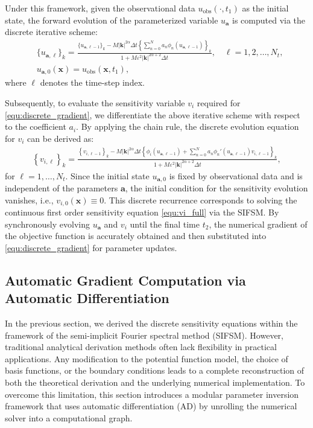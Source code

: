 \documentclass[11pt,reqno]{amsart}
\begin{document}
Under this framework, given the observational data $u_{\text{obs}}(\cdot, t_1)$ as the initial state, the forward evolution of the parameterized variable $u_{\mathbf{a}}$ is computed via the discrete iterative scheme:
\begin{align*}
	&\{u_{\mathbf{a},\ell}\}_k = \frac{\{u_{\mathbf{a},\ell-1}\}_k - M|\mathbf{k}|^{2\alpha}\Delta t \left\{\sum_{n=0}^N a_n\phi_n(u_{\mathbf{a},\ell-1})\right\}_k}{1 + M\varepsilon^2|\mathbf{k}|^{2\alpha+2}\Delta t}, \quad \ell = 1,2,\dots,N_t,\\
	&u_{\mathbf{a},0}(\mathbf{x}) = u_{\text{obs}}(\mathbf{x}, t_1),
\end{align*}
where $\ell$ denotes the time-step index. 

Subsequently, to evaluate the sensitivity variable $v_i$ required for \eqref{equ:discrete_gradient}, we differentiate the above iterative scheme with respect to the coefficient $a_i$. By applying the chain rule, the discrete evolution equation for $v_i$ can be derived as:
\begin{align}
	\label{equ:iter_v}
	\left\{v_{i,\ell}\right\}_k = \frac{\left\{v_{i,\ell-1}\right\}_k - M|\mathbf{k}|^{2\alpha}\Delta t \left\{\phi_i(u_{\mathbf{a},\ell-1}) + \sum_{n=0}^N a_n \phi_n'(u_{\mathbf{a},\ell-1}) v_{i,\ell-1} \right\}_k}{1 + M\varepsilon^2|\mathbf{k}|^{2\alpha+2}\Delta t},
\end{align}
for $\ell = 1,\dots,N_t$. Since the initial state $u_{\mathbf{a},0}$ is fixed by observational data and is independent of the parameters $\mathbf{a}$, the initial condition for the sensitivity evolution vanishes, i.e., $v_{i,0}(\mathbf{x}) \equiv 0$. This discrete recurrence corresponds to solving the continuous first order sensitivity equation \eqref{equ:vi_full} via the SIFSM. By synchronously evolving $u_{\mathbf{a}}$ and $v_i$ until the final time $t_2$, the numerical gradient of the objective function is accurately obtained and then substituted into \eqref{equ:discrete_gradient} for parameter updates.

\subsection{Automatic Gradient Computation via Automatic Differentiation}

In the previous section, we derived the discrete sensitivity equations within the framework of the semi-implicit Fourier spectral method (SIFSM). However, traditional analytical derivation methods often lack flexibility in practical applications. Any modification to the potential function model, the choice of basis functions, or the boundary conditions leads to a complete reconstruction of both the theoretical derivation and the underlying numerical implementation. To overcome this limitation, this section introduces a modular parameter inversion framework that uses automatic differentiation (AD) by unrolling the numerical solver into a computational graph.
\end{document}
